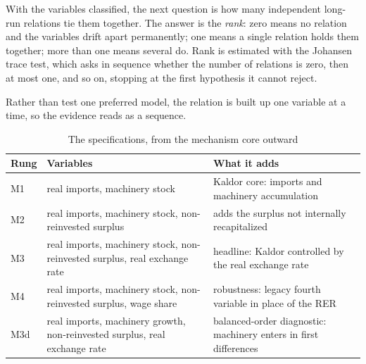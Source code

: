 \documentclass[11pt]{article}
\begin{document}
With the variables classified, the next question is how many independent long-run relations tie them together. The answer is the \emph{rank}: zero means no relation and the variables drift apart permanently; one means a single relation holds them together; more than one means several do. Rank is estimated with the Johansen trace test, which asks in sequence whether the number of relations is zero, then at most one, and so on, stopping at the first hypothesis it cannot reject.

Rather than test one preferred model, the relation is built up one variable at a time, so the evidence reads as a sequence.

\begin{table}[H]
\centering
\caption{The specifications, from the mechanism core outward}
\footnotesize
\begin{tabular}{p{1.4cm}p{6.2cm}p{6.4cm}}
\toprule
\textbf{Rung} & \textbf{Variables} & \textbf{What it adds} \\
\midrule
M1 & real imports, machinery stock & Kaldor core: imports and machinery accumulation \\
M2 & real imports, machinery stock, non-reinvested surplus & adds the surplus not internally recapitalized \\
M3 & real imports, machinery stock, non-reinvested surplus, real exchange rate & headline: Kaldor controlled by the real exchange rate \\
M4 & real imports, machinery stock, non-reinvested surplus, wage share & robustness: legacy fourth variable in place of the RER \\
M3d & real imports, machinery growth, non-reinvested surplus, real exchange rate & balanced-order diagnostic: machinery enters in first differences \\
\bottomrule
\end{tabular}
\end{table}
\end{document}
